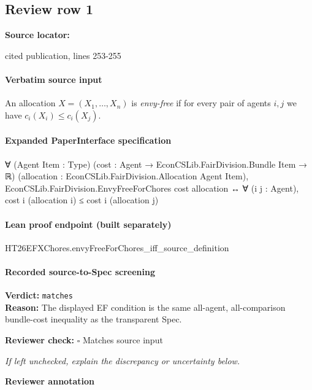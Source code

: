 \documentclass[10pt]{article}
\newcommand{\reviewerbox}{%
  \par\noindent\fbox{\parbox{0.96\linewidth}{\rule{0pt}{0.38in}}}\par
}
\newcommand{\reviewmatch}[1]{%
  \par\noindent\textbf{Reviewer check:} $\square$\; #1\par
  \noindent\emph{If left unchecked, explain the discrepancy or uncertainty below.}\par
}
\begin{document}
\subsection*{Review row 1}
\textbf{Source locator:} {\footnotesize\raggedright cited publication, lines 253-\allowbreak{}255\par}
\paragraph{Verbatim source input}
\begin{ReviewVerbatim}
\begin{definition}
An allocation $X=(X_1,\ldots,X_n)$ is \emph{envy-free} if for every pair of agents $i,j$ we have $c_i(X_i)\leq c_i(X_j)$.
\end{definition}
\end{ReviewVerbatim}


\paragraph{Expanded PaperInterface specification}
\begin{ReviewVerbatim}
∀ (Agent Item : Type) (cost : Agent → EconCSLib.FairDivision.Bundle Item → ℝ)
  (allocation : EconCSLib.FairDivision.Allocation Agent Item),
  EconCSLib.FairDivision.EnvyFreeForChores cost allocation ↔
    ∀ (i j : Agent), cost i (allocation i) ≤ cost i (allocation j)
\end{ReviewVerbatim}

\paragraph{Lean proof endpoint (built separately)}\begin{ReviewVerbatim}
HT26EFXChores.envyFreeForChores_iff_source_definition
\end{ReviewVerbatim}

\paragraph{Recorded source-to-Spec screening}
\textbf{Verdict:} \texttt{matches}
\\
\textbf{Reason:} The displayed EF condition is the same all-agent, all-comparison bundle-cost inequality as the transparent Spec.
\reviewmatch{Matches source input}
\noindent\textbf{Reviewer annotation}\par
\reviewerbox
\clearpage
\hypertarget{source-claim-dc1c37ece7fbf653}{}
\end{document}
